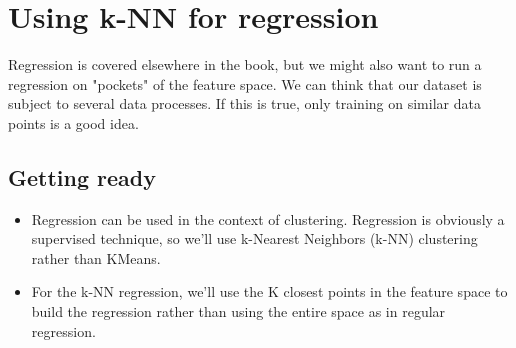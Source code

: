 \documentclass[SKL-MASTER.tex]{subfiles}
\begin{document}
	\Large
\section*{Using k-NN for regression}
Regression is covered elsewhere in the book, but we might also want to run a regression
on "pockets" of the feature space. We can think that our dataset is subject to several data
processes. If this is true, only training on similar data points is a good idea.
\subsection*{Getting ready}
\begin{itemize}
\item Regression can be used in the context of clustering. Regression is obviously a
supervised technique, so we'll use k-Nearest Neighbors (k-NN) clustering rather than KMeans.
\item For the k-NN regression, we'll use the K closest points in the feature space to build the
regression rather than using the entire space as in regular regression.
\end{itemize}
\end{document}
